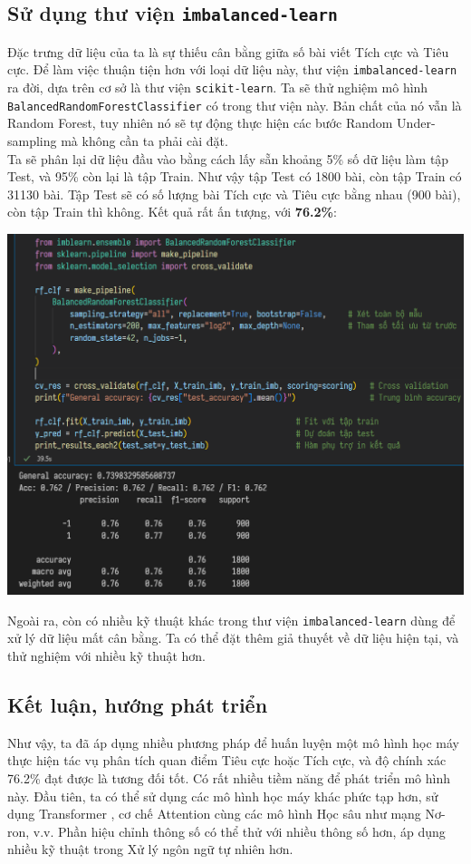 \subsection{Sử dụng thư viện \texttt{imbalanced-learn}}
Đặc trưng dữ liệu của ta là sự thiếu cân bằng giữa số bài viết Tích cực và Tiêu cực. Để làm việc thuận tiện hơn với loại dữ liệu này, thư viện \texttt{imbalanced-learn} \cite{imblearn} ra đời, dựa trên cơ sở là thư viện \texttt{scikit-learn}. Ta sẽ thử nghiệm mô hình \texttt{BalancedRandomForestClassifier} có trong thư viện này. Bản chất của nó vẫn là Random Forest, tuy nhiên nó sẽ tự động thực hiện các bước Random Under-sampling mà không cần ta phải cài đặt.\\

Ta sẽ phân lại dữ liệu đầu vào bằng cách lấy sẵn khoảng 5\% số dữ liệu làm tập Test, và 95\% còn lại là tập Train. Như vậy tập Test có 1800 bài, còn tập Train có 31130 bài. Tập Test sẽ có số lượng bài Tích cực và Tiêu cực bằng nhau (900 bài), còn tập Train thì không. Kết quả rất ấn tượng, với \textbf{76.2\%}:
\begin{center}
\includegraphics[width=1\textwidth]{images/code-5.16-imblearn1.png}
\end{center}

Ngoài ra, còn có nhiều kỹ thuật khác trong thư viện \texttt{imbalanced-learn} dùng để xử lý dữ liệu mất cân bằng. Ta có thể đặt thêm giả thuyết về dữ liệu hiện tại, và thử nghiệm với nhiều kỹ thuật hơn.

\subsection{Kết luận, hướng phát triển}
Như vậy, ta đã áp dụng nhiều phương pháp để huấn luyện một mô hình học máy thực hiện tác vụ phân tích quan điểm Tiêu cực hoặc Tích cực, và độ chính xác 76.2\% đạt được là tương đối tốt. Có rất nhiều tiềm năng để phát triển mô hình này. Đầu tiên, ta có thể sử dụng các mô hình học máy khác phức tạp hơn, sử dụng Transformer \cite{datta2024transformers}, cơ chế Attention cùng các mô hình Học sâu như mạng Nơ-ron, v.v. Phần hiệu chỉnh thông số có thể thử với nhiều thông số hơn, áp dụng nhiều kỹ thuật trong Xử lý ngôn ngữ tự nhiên hơn.\\

